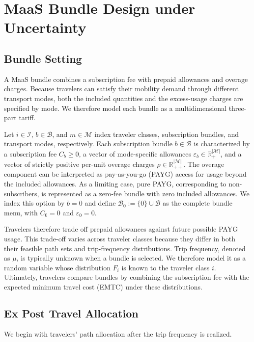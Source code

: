\documentclass{article}
\begin{document}
\section{MaaS Bundle Design under Uncertainty}

\subsection{Bundle Setting}

A MaaS bundle combines a subscription fee with prepaid allowances and overage charges. Because travelers can satisfy their mobility demand through different transport modes, both the included quantities and the excess-usage charges are specified by mode. We therefore model each bundle as a multidimensional three-part tariff.

Let $i\in\mathcal I$, $b\in\mathcal B$, and $m\in\mathcal M$ index traveler classes, subscription bundles, and transport modes, respectively. Each subscription bundle $b\in\mathcal B$ is characterized by a subscription fee $C_b\geq 0$, a vector of mode-specific allowances $\varepsilon_b\in\mathbb{R}_+^{|\mathcal M|}$, and a vector of strictly positive per-unit overage charges $\rho\in\mathbb{R}_{++}^{|\mathcal M|}$. The overage component can be interpreted as pay-as-you-go (PAYG) access for usage beyond the included allowances. As a limiting case, pure PAYG, corresponding to non-subscribers, is represented as a zero-fee bundle with zero included allowances. We index this option by $b=0$ and define $\mathcal B_0:=\{0\}\cup\mathcal B$ as the complete bundle menu, with $C_0=0$ and $\varepsilon_0=0$.

Travelers therefore trade off prepaid allowances against future possible PAYG usage. This trade-off varies across traveler classes because they differ in both their feasible path sets and trip-frequency distributions. Trip frequency,  denoted as $\mu$, is typically unknown when a bundle is selected. We therefore model it as a random variable whose distribution $F_i$ is known to the traveler class $i$. Ultimately, travelers compare bundles by combining the subscription fee with the expected minimum travel cost (EMTC) under these distributions.

\subsection{Ex Post Travel Allocation}

We begin with travelers' path allocation after the trip frequency is realized.
\end{document}
